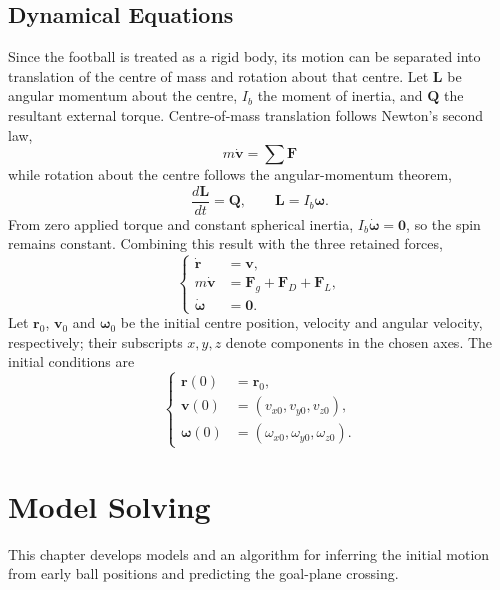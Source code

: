 \documentclass[12pt,letterpaper]{article}
\begin{document}
\subsection{Dynamical Equations}\label{sec:dynamics}
Since the football is treated as a rigid body, its motion can be separated into translation of the centre of mass and rotation about that centre. Let $\boldsymbol L$ be angular momentum about the centre, $I_b$ the moment of inertia, and $\boldsymbol Q$ the resultant external torque. Centre-of-mass translation follows Newton's second law,
\begin{equation}
  m\dot{\boldsymbol v} =\sum\boldsymbol F
\end{equation}
while rotation about the centre follows the angular-momentum theorem,
\begin{equation}
\dfrac{d\boldsymbol L}{dt} =\boldsymbol Q,\qquad\boldsymbol L=I_b\boldsymbol\omega.
\end{equation}
From zero applied torque and constant spherical inertia, $I_b\dot{\boldsymbol\omega}=\boldsymbol0$, so the spin remains constant. Combining this result with the three retained forces,
\begin{equation}
\left\{\begin{aligned}
\dot{\boldsymbol r}&=\boldsymbol v,\\
m\dot{\boldsymbol v}&=\boldsymbol F_g+\boldsymbol F_D+\boldsymbol F_L,\\
\dot{\boldsymbol\omega}&=\boldsymbol0.
\end{aligned}\right.\label{eq:motion}
\end{equation}
Let $\boldsymbol r_0$, $\boldsymbol v_0$ and $\boldsymbol\omega_0$ be the initial centre position, velocity and angular velocity, respectively; their subscripts $x,y,z$ denote components in the chosen axes. The initial conditions are
\begin{equation}
\left\{\begin{aligned}
\boldsymbol r(0)&=\boldsymbol r_0,\\
\boldsymbol v(0)&=(v_{x0},v_{y0},v_{z0}),\\
\boldsymbol\omega(0)&=(\omega_{x0},\omega_{y0},\omega_{z0}).
\end{aligned}\right.\label{eq:initial}
\end{equation}

\section{Model Solving}\label{sec:solving}
This chapter develops models and an algorithm for inferring the initial motion from early ball positions and predicting the goal-plane crossing.
\end{document}
